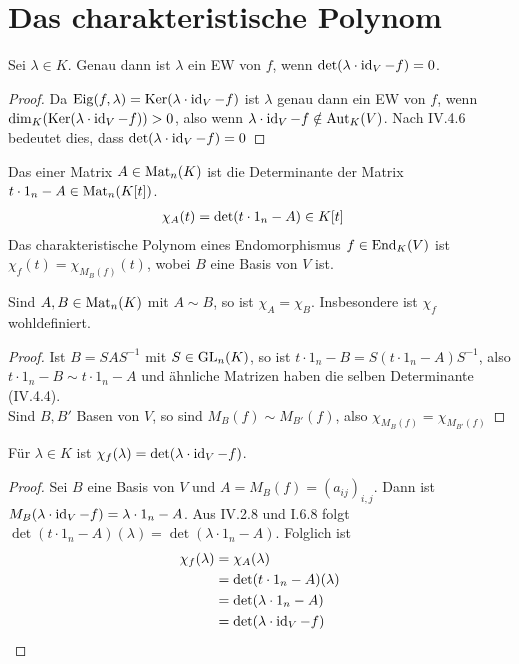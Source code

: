 \section{Das charakteristische Polynom}

\begin{proposition}
	Sei $\lambda\in K$. Genau dann ist $\lambda$ ein EW von $f$, wenn $\det(\lambda\cdot\operatorname{id}_V-f)=0$.
\end{proposition}
\begin{proof}
	Da $\operatorname{Eig}(f,\lambda)=\operatorname{Ker}(\lambda\cdot\operatorname{id}_V-f)$ ist $\lambda$ genau dann ein EW von $f$, wenn $\dim_K(\operatorname{Ker}(\lambda\cdot\operatorname{id}_V-f))>0$, also wenn $\lambda\cdot\operatorname{id}_V-f\notin\operatorname{Aut}_K(V)$. Nach IV.4.6 bedeutet dies, dass $\det(\lambda\cdot\operatorname{id}_V-f)=0$ %
\end{proof}

\begin{definition}
	Das  einer Matrix $A\in\operatorname{Mat}_n(K)$ ist die Determinante der Matrix $t\cdot 1_n-A\in\operatorname{Mat}_n(K[t])$. 
	\begin{align}
		\chi_A(t)&=\det(t\cdot 1_n-A)\in K[t] \notag
	\end{align}
	Das charakteristische Polynom eines Endomorphismus $f\in\operatorname{End}_K(V)$ ist $\chi_f(t)=\chi_{M_B(f)}(t)$, wobei $B$ eine Basis von $V$ ist.
\end{definition}

\begin{proposition}
	Sind $A,B\in\operatorname{Mat}_n(K)$ mit $A\sim B$, so ist $\chi_A=\chi_B$. Insbesondere ist $\chi_f$ wohldefiniert.
\end{proposition}
\begin{proof}
	Ist $B=SAS^{-1}$ mit $S\in\operatorname{GL}_n(K)$, so ist $t\cdot 1_n-B = S(t\cdot 1_n-A)S^{-1}$, also $t\cdot 1_n-B\sim t\cdot 1_n-A$ und ähnliche Matrizen haben die selben Determinante (IV.4.4). \\
	Sind $B,B'$ Basen von $V$, so sind $M_B(f)\sim M_{B'}(f)$, also $\chi_{M_B(f)}=\chi_{M_{B'}(f)}$ %
\end{proof}

\begin{lemma}
	Für $\lambda\in K$ ist $\chi_f(\lambda)=\det(\lambda\cdot\operatorname{id}_V-f)$.
\end{lemma}
\begin{proof}
	Sei $B$ eine Basis von $V$ und $A=M_B(f)=(a_{ij})_{i,j}$. Dann ist $M_B(\lambda\cdot\operatorname{id}_V-f)= \lambda\cdot 1_n-A$. Aus IV.2.8 und I.6.8 folgt $\det(t\cdot 1_n-A)(\lambda)=\det(\lambda\cdot 1_n-A)$. Folglich ist 
	\begin{align}
		\chi_f(\lambda)&=\chi_A(\lambda)\notag \\
		&=\det(t\cdot 1_n-A)(\lambda)\notag \\
		&=\det(\lambda\cdot 1_n-A)\notag \\
		&= \det(\lambda\cdot\operatorname{id}_V-f) \notag
	\end{align}
\end{proof}

